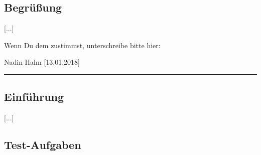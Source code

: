 \subsection*{Begrüßung}
[...]

Wenn Du dem zustimmst, unterschreibe bitte hier:

\vspace*{1em}
Nadin Hahn [13.01.2018]\vspace*{-.9em}\\
\noindent\rule{8cm}{0.4pt}

\subsection*{Einführung}
[...]


\subsection*{Test-Aufgaben}
